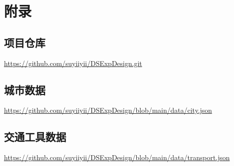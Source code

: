 \documentclass[10pt]{article}
\begin{document}
    \appendix


    \section{附录}

    \subsection{项目仓库}
    \href{https://github.com/suyiiyii/DSExpDesign.git}{https://github.com/suyiiyii/DSExpDesign.git} \label{项目仓库}

    \subsection{城市数据}
    \href{https://github.com/suyiiyii/DSExpDesign/blob/main/data/city.json}{https://github.com/suyiiyii/DSExpDesign/blob/main/data/city.json} \label{city_data}

    \subsection{交通工具数据}
    \href{https://github.com/suyiiyii/DSExpDesign/blob/main/data/transport.json}{https://github.com/suyiiyii/DSExpDesign/blob/main/data/transport.json} \label{transport_data}
\end{document}
